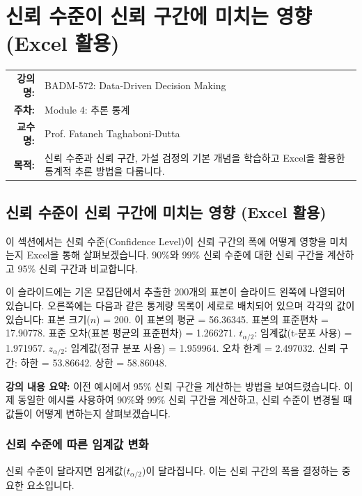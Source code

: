 \documentclass[11pt,a4paper]{book}
\makeatletter
\theoremstyle{definition}
\newcommand{\metainfo}[4]{
\begin{tcolorbox}[
    colback=lightpurple,
    colframe=darkpurple,
    boxrule=1pt,
    arc=2mm,
    left=10pt,
    right=10pt,
    top=8pt,
    bottom=8pt
]
\begin{tabular}{@{}rl@{}}
\textbf{강의명:} & #1 \\[0.3em]
\textbf{주차:} & #2 \\[0.3em]
\textbf{교수명:} & #3 \\[0.3em]
\textbf{목적:} & \begin{minipage}[t]{0.75\textwidth}#4\end{minipage}
\end{tabular}
\end{tcolorbox}
}
\makeatother
\begin{document}
\chapter{신뢰 수준이 신뢰 구간에 미치는 영향 (Excel 활용)}
\label{ch:module4}

\metainfo{BADM-572: Data-Driven Decision Making}{Module 4: 추론 통계}{Prof. Fataneh Taghaboni-Dutta}{신뢰 수준과 신뢰 구간, 가설 검정의 기본 개념을 학습하고 Excel을 활용한 통계적 추론 방법을 다룹니다.}


\section{신뢰 수준이 신뢰 구간에 미치는 영향 (Excel 활용)}

이 섹션에서는 신뢰 수준(Confidence Level)이 신뢰 구간의 폭에 어떻게 영향을 미치는지 Excel을 통해 살펴보겠습니다. 90\%와 99\% 신뢰 수준에 대한 신뢰 구간을 계산하고 95\% 신뢰 구간과 비교합니다.

\begin{tcolorbox}[title={슬라이드 54: 뉴욕 일일 기온 샘플 Excel 시트 (1/13)}]
이 슬라이드에는 기온 모집단에서 추출한 200개의 표본이 슬라이드 왼쪽에 나열되어 있습니다. 오른쪽에는 다음과 같은 통계량 목록이 세로로 배치되어 있으며 각각의 값이 있습니다: 표본 크기($n$) = 200. 이 표본의 평균 = 56.36345. 표본의 표준편차 = 17.90778. 표준 오차(표본 평균의 표준편차) = 1.266271. $t_{\alpha/2}$: 임계값(t-분포 사용) = 1.971957. $z_{\alpha/2}$: 임계값(정규 분포 사용) = 1.959964. 오차 한계 = 2.497032. 신뢰 구간: 하한 = 53.86642. 상한 = 58.86048.
\end{tcolorbox}

\textbf{강의 내용 요약:}
이전 예시에서 95\% 신뢰 구간을 계산하는 방법을 보여드렸습니다. 이제 동일한 예시를 사용하여 90\%와 99\% 신뢰 구간을 계산하고, 신뢰 수준이 변경될 때 값들이 어떻게 변하는지 살펴보겠습니다.

\subsection{신뢰 수준에 따른 임계값 변화}

신뢰 수준이 달라지면 임계값($t_{\alpha/2}$)이 달라집니다. 이는 신뢰 구간의 폭을 결정하는 중요한 요소입니다.
\end{document}
